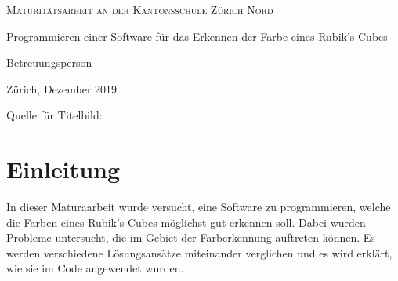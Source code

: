 \documentclass[a4paper, 12pt]{article}
\begin{document}
\begin{titlepage}
	\centering
	{\scshape\Large Maturitätsarbeit an der Kantonsschule Zürich Nord \par}
	\vspace{1cm}
	\vspace{1cm}
	{\LARGE Programmieren einer Software für das Erkennen der Farbe eines Rubik's Cubes\par}
	\vspace{2cm}	
	\vfill
	Betreuungsperson\par

	\vfill

	{\large Zürich, Dezember 2019\par}
\end{titlepage}
\newpage
 \thispagestyle{empty}
Quelle für Titelbild: \cite{Ueberwachung_Bild}
\newpage
{}

\begin{abstract}%
\noindent
Ziel dieser Maturaarbeit war, ein möglichst gutes Programm für die Farberkennung eines Rubik's Cubes zu programmieren. Dafür wurden die beiden Farbräume RGB und HSV miteinander verglichen. Ausserdem wurde eine spezielle Methode für das Erkennen von schwarzen und weissen Feldern ausprobiert. Zum Schluss wurden dann noch zwei Methoden verglichen, die Korrekturen vornahmen, so dass jede Farbe exakt neunmal vorkommt. Das ausschliessliche Verwenden von Hue zur Unterscheidung der Farben, das Benützen der Methode, um Weiss und Schwarz auszusortieren, und das Verwenden einer der zwei Korrekturmethoden lieferte die besten Ergebnisse, mit durchschnittlich 8.5 Fehlern bei 54 Feldern.
\end{abstract}
\tableofcontents
\clearpage
\newpage\null\thispagestyle{empty}\newpage
{} 
\newpage
\section{Einleitung}
In dieser Maturaarbeit wurde versucht, eine Software zu programmieren, welche die Farben eines Rubik's Cubes möglichst gut erkennen soll. Dabei wurden Probleme untersucht, die im Gebiet der Farberkennung auftreten können. Es werden verschiedene Lösungsansätze miteinander verglichen und es wird erklärt, wie sie im Code angewendet wurden.
\end{document}
